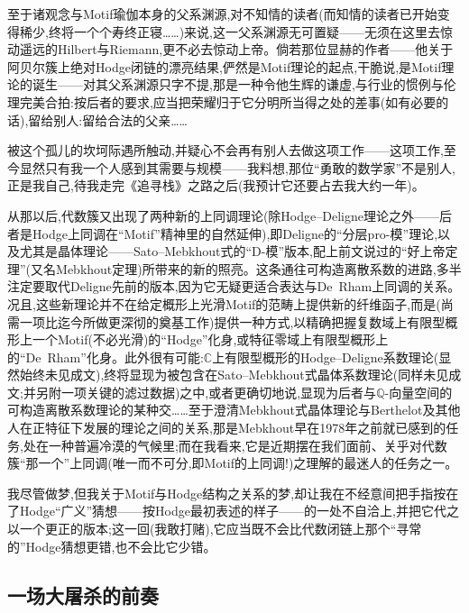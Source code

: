 至于诸观念与Motif瑜伽本身的父系渊源,对不知情的读者(而知情的读者已开始变得稀少,终将一个个寿终正寝……)来说,这一父系渊源无可置疑——无须在这里去惊动遥远的Hilbert与Riemann,更不必去惊动上帝。倘若那位显赫的作者——他关于阿贝尔簇上绝对Hodge闭链的漂亮结果,俨然是Motif理论的起点,干脆说,是Motif理论的诞生——对其父系渊源只字不提,那是一种令他生辉的谦虚\dmark{},与行业的惯例与伦理完美合拍:按后者的要求,应当把荣耀归于它分明所当得之处的差事(如有必要的话),留给别人:留给合法的父亲……


被这个孤儿的坎坷际遇所触动,并疑心不会再有别人去做这项工作——这项工作,至今显然只有我一个人感到其需要与规模——我料想,那位“勇敢的数学家”不是别人,正是我自己,待我走完《追寻栈》之路之后(我预计它还要占去我大约一年)。


从那以后,代数簇又出现了两种新的上同调理论(除Hodge--Deligne理论之外——后者是Hodge上同调在“Motif”精神里的自然延伸),即Deligne的“分层pro-模”理论,以及尤其是晶体理论——Sato--Mebkhout式的“D-模”版本,配上前文说过的“好上帝定理”(又名Mebkhout定理)所带来的新的照亮。这条通往可构造离散系数的进路,多半注定要取代Deligne先前的版本,因为它无疑更适合表达与De~Rham上同调的关系。况且,这些新理论并不在给定概形上光滑Motif的范畴上提供新的纤维函子,而是(尚需一项比迄今所做更深彻的奠基工作)提供一种方式,以精确把握复数域上有限型概形上一个Motif(不必光滑)的“Hodge”化身,或特征零域上有限型概形上的“De~Rham”化身。此外很有可能:$\mathbb{C}$上有限型概形的Hodge--Deligne系数理论(显然始终未见成文),终将显现为被包含在Sato--Mebkhout式晶体系数理论(同样未见成文;并另附一项关键的滤过数据)之中,或者更确切地说,显现为后者与$\mathbb{Q}$-向量空间的可构造离散系数理论的某种交……至于澄清Mebkhout式晶体理论与Berthelot及其他人在正特征下发展的理论之间的关系,那是Mebkhout早在1978年之前就已感到的任务,处在一种普遍冷漠的气候里;而在我看来,它是近期摆在我们面前、关乎对代数簇“那一个”上同调(唯一而不可分,即Motif的上同调!)之理解的最迷人的任务之一。


\dmark{}我尽管做梦,但我关于Motif与Hodge结构之关系的梦,却让我在不经意间把手指按在了Hodge“广义”猜想——按Hodge最初表述的样子——的一处不自洽上,并把它代之以一个更正的版本;这一回(我敢打赌),它应当既不会比代数闭链上那个“寻常的”Hodge猜想更错,也不会比它少错。

\subsection{一场大屠杀的前奏}


